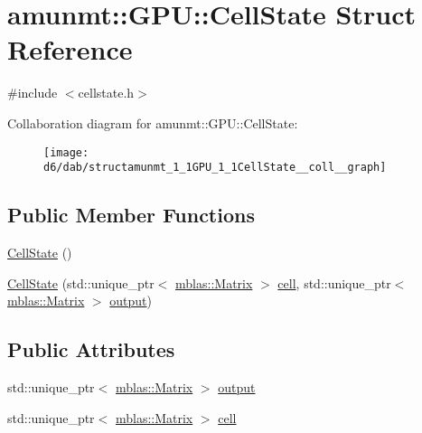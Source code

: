 \hypertarget{structamunmt_1_1GPU_1_1CellState}{}\section{amunmt\+:\+:G\+PU\+:\+:Cell\+State Struct Reference}
\label{structamunmt_1_1GPU_1_1CellState}


{\ttfamily \#include $<$cellstate.\+h$>$}



Collaboration diagram for amunmt\+:\+:G\+PU\+:\+:Cell\+State\+:
\nopagebreak
\begin{figure}[H]
\begin{center}
\leavevmode
\texttt{[image: d6/dab/structamunmt\_1\_1GPU\_1\_1CellState\_\_coll\_\_graph]}
\end{center}
\end{figure}
\subsection*{Public Member Functions}
\begin{DoxyCompactItemize}
\item 
\hyperlink{structamunmt_1_1GPU_1_1CellState_a3a2c43fc9bfad16b96985a13ccff659e}{Cell\+State} ()
\item 
\hyperlink{structamunmt_1_1GPU_1_1CellState_ad4167f08591116e885bbc6679190939d}{Cell\+State} (std\+::unique\+\_\+ptr$<$ \hyperlink{namespaceamunmt_1_1GPU_1_1mblas_ab67821a8254de53e45a623cf73c0aef6}{mblas\+::\+Matrix} $>$ \hyperlink{structamunmt_1_1GPU_1_1CellState_a3d8d1a31845d19b6b635b0a99029e21a}{cell}, std\+::unique\+\_\+ptr$<$ \hyperlink{namespaceamunmt_1_1GPU_1_1mblas_ab67821a8254de53e45a623cf73c0aef6}{mblas\+::\+Matrix} $>$ \hyperlink{structamunmt_1_1GPU_1_1CellState_ac2d94a4fd199fe8458529a075b9df1b7}{output})
\end{DoxyCompactItemize}
\subsection*{Public Attributes}
\begin{DoxyCompactItemize}
\item 
std\+::unique\+\_\+ptr$<$ \hyperlink{namespaceamunmt_1_1GPU_1_1mblas_ab67821a8254de53e45a623cf73c0aef6}{mblas\+::\+Matrix} $>$ \hyperlink{structamunmt_1_1GPU_1_1CellState_ac2d94a4fd199fe8458529a075b9df1b7}{output}
\item 
std\+::unique\+\_\+ptr$<$ \hyperlink{namespaceamunmt_1_1GPU_1_1mblas_ab67821a8254de53e45a623cf73c0aef6}{mblas\+::\+Matrix} $>$ \hyperlink{structamunmt_1_1GPU_1_1CellState_a3d8d1a31845d19b6b635b0a99029e21a}{cell}
\end{DoxyCompactItemize}


